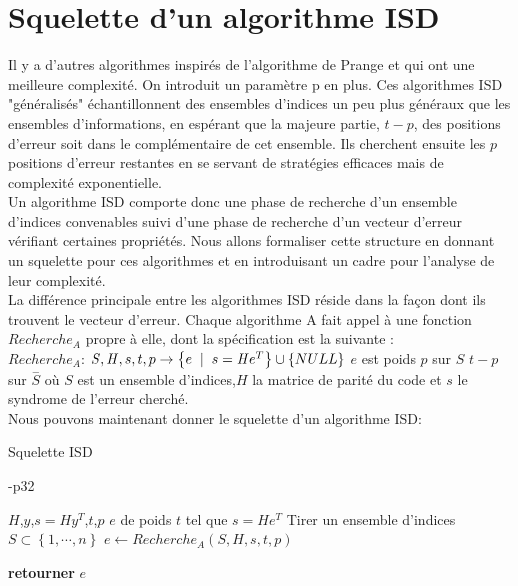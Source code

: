 \documentclass[12pt,openany]{report}
\begin{document}
\section{Squelette d'un algorithme ISD}
Il y a d’autres algorithmes inspirés de l’algorithme de Prange et qui ont une meilleure complexité. On introduit un paramètre p en plus. Ces algorithmes
ISD "généralisés" échantillonnent des ensembles d’indices un peu plus généraux
que les ensembles d’informations, en espérant que la majeure partie, $t-p$, des
positions d’erreur soit dans le complémentaire de cet ensemble. Ils cherchent
ensuite les $p$ positions d’erreur restantes en se servant de stratégies efficaces
mais de complexité exponentielle.\\
Un algorithme ISD comporte donc une phase de recherche d’un ensemble d’indices
convenables suivi d’une phase de recherche d’un vecteur d’erreur vérifiant certaines
propriétés. Nous allons formaliser cette structure en donnant un squelette pour
ces algorithmes et en introduisant un cadre pour l’analyse de leur complexité.\\
La différence principale entre les algorithmes ISD réside dans la façon dont
ils trouvent le vecteur d’erreur. Chaque algorithme A fait appel à une fonction
$Recherche_A$ propre à elle, dont la spécification est la suivante :\\
$Recherche_A$: $ \mathit{S},\mathit{H},s,t,p \rightarrow \left\lbrace e \hspace{0.2cm} |\hspace{0.2cm} s=\mathit{H}e^T   \right\rbrace \cup \left\lbrace NULL \right\rbrace $\hspace{0.2cm} $e$ \hspace{0.1cm} est poids $p$ \hspace{0.1cm}sur $ \mathit{S}$ \hspace{0.2cm}  $t-p$ sur $\overset{-}{\mathit{S}}$
\hspace{0.2cm} où $\mathit{S}$ est un ensemble d'indices,$\mathit{H}$ la matrice de parité du code et $s$ le syndrome de l'erreur cherché.\\
Nous pouvons maintenant donner le squelette d'un algorithme ISD:
\begin{algorithm}
\caption{Squelette ISD } \cite{Ghazal}-p32
\begin{algorithmic}[1] 
\Require $\mathit{H}$,$y$,$s=\mathit{H}y^T$,$t$,$p$
\Ensure $e$ de poids $t$ tel que $s=\mathit{H}e^T $
\State \Repeat
\State Tirer un ensemble d’indices $\mathit{S} \subset \left\lbrace  1,\cdots, n \right\rbrace $
\State $e\gets Recherche_A(\mathit{S},\mathit{H},s,t,p)  $
    
    \State {}
    \State \textbf{retourner} $e$
\end{algorithmic}
\end{algorithm}
\end{document}
